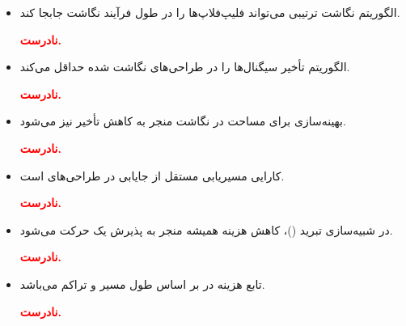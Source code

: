 \begin{itemize}
	
	
	
	\item الگوریتم نگاشت ترتیبی می‌تواند فلیپ‌فلاپ‌ها را در طول فرآیند نگاشت جابجا کند.
	\begin{qsolve}
		\textbf{\textcolor{red}{نادرست.}}\\
	\end{qsolve}
	
	
	
	
	\item الگوریتم  تأخیر سیگنال‌ها را در طراحی‌های نگاشت شده حداقل می‌کند.
	\begin{qsolve}
		\textbf{\textcolor{red}{نادرست.}}\\
	\end{qsolve}
	
	
	
	\item بهینه‌سازی برای مساحت در نگاشت منجر به کاهش تأخیر نیز می‌شود.
	\begin{qsolve}
		\textbf{\textcolor{red}{نادرست.}}\\
	\end{qsolve}
	
	
	\item کارایی مسیریابی مستقل از جایابی در طراحی‌های  است.
	\begin{qsolve}
		\textbf{\textcolor{red}{نادرست.}}\\
	\end{qsolve}
	
	
	\item در شبیه‌سازی تبرید ()، کاهش هزینه همیشه منجر به پذیرش یک حرکت می‌شود.
	\begin{qsolve}
		\textbf{\textcolor{red}{نادرست.}}\\
	\end{qsolve}
	
	
	\item تابع هزینه در  بر اساس طول مسیر و تراکم می‌باشد.
	\begin{qsolve}
		\textbf{\textcolor{red}{نادرست.}}\\
	\end{qsolve}
	
\end{itemize}












